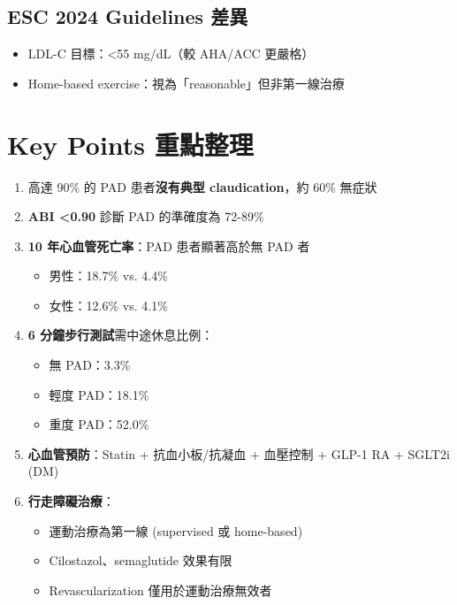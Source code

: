 \documentclass[12pt,a4paper]{article}
\begin{document}
\subsection{ESC 2024 Guidelines 差異}

\begin{itemize}[leftmargin=2em]
    \item LDL-C 目標：<55 mg/dL（較 AHA/ACC 更嚴格）
    \item Home-based exercise：視為「reasonable」但非第一線治療
\end{itemize}

\section{Key Points 重點整理}

\begin{importantbox}
\begin{enumerate}[leftmargin=2em]
    \item 高達 90\% 的 PAD 患者\textbf{沒有典型 claudication}，約 60\% 無症狀

    \item \textbf{ABI <0.90} 診斷 PAD 的準確度為 72-89\%

    \item \textbf{10 年心血管死亡率}：PAD 患者顯著高於無 PAD 者
    \begin{itemize}
        \item 男性：18.7\% vs. 4.4\%
        \item 女性：12.6\% vs. 4.1\%
    \end{itemize}

    \item \textbf{6 分鐘步行測試}需中途休息比例：
    \begin{itemize}
        \item 無 PAD：3.3\%
        \item 輕度 PAD：18.1\%
        \item 重度 PAD：52.0\%
    \end{itemize}

    \item \textbf{心血管預防}：Statin + 抗血小板/抗凝血 + 血壓控制 + GLP-1 RA + SGLT2i (DM)

    \item \textbf{行走障礙治療}：
    \begin{itemize}
        \item 運動治療為第一線 (supervised 或 home-based)
        \item Cilostazol、semaglutide 效果有限
        \item Revascularization 僅用於運動治療無效者
    \end{itemize}
\end{enumerate}
\end{importantbox}
\end{document}
